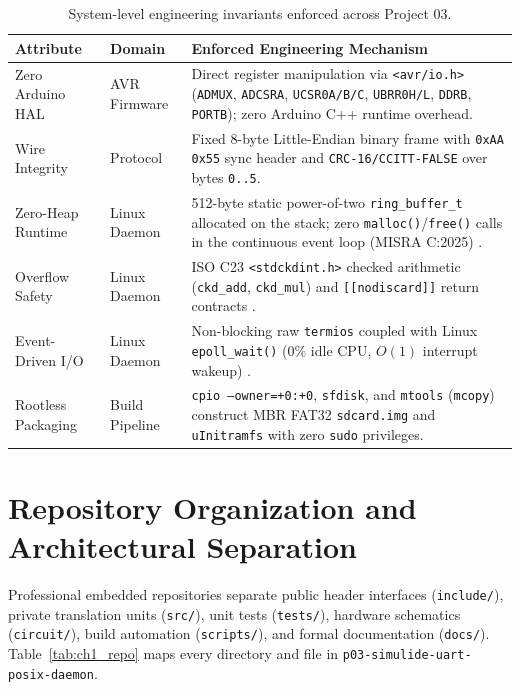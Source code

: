 \documentclass[11pt,a4paper,oneside]{report}
\begin{document}
\begin{table}[!htbp]
\centering
\caption{System-level engineering invariants enforced across Project 03.}
\label{tab:ch1_invariants}
\begin{tabularx}{\linewidth}{l l X}
\toprule
\textbf{Attribute} & \textbf{Domain} & \textbf{Enforced Engineering Mechanism} \\
\midrule
Zero Arduino HAL & AVR Firmware & Direct register manipulation via \texttt{<avr/io.h>} (\texttt{ADMUX}, \texttt{ADCSRA}, \texttt{UCSR0A/B/C}, \texttt{UBRR0H/L}, \texttt{DDRB}, \texttt{PORTB}); zero Arduino C++ runtime overhead. \\
Wire Integrity & Protocol & Fixed 8-byte Little-Endian binary frame with \texttt{0xAA 0x55} sync header and \texttt{CRC-16/CCITT-FALSE} over bytes \texttt{0..5}. \\
Zero-Heap Runtime & Linux Daemon & 512-byte static power-of-two \texttt{ring\_buffer\_t} allocated on the stack; zero \texttt{malloc()}/\texttt{free()} calls in the continuous event loop (MISRA C:2025) \cite{misra2025}. \\
Overflow Safety & Linux Daemon & ISO C23 \texttt{<stdckdint.h>} checked arithmetic (\texttt{ckd\_add}, \texttt{ckd\_mul}) and \texttt{[[nodiscard]]} return contracts \cite{gustedt2025,cppref_numeric}. \\
Event-Driven I/O & Linux Daemon & Non-blocking raw \texttt{termios} coupled with Linux \texttt{epoll\_wait()} ($0\%$ idle CPU, $O(1)$ interrupt wakeup) \cite{man_termios,man_epoll}. \\
Rootless Packaging & Build Pipeline & \texttt{cpio --owner=+0:+0}, \texttt{sfdisk}, and \texttt{mtools} (\texttt{mcopy}) construct MBR FAT32 \texttt{sdcard.img} and \texttt{uInitramfs} with zero \texttt{sudo} privileges. \\
\bottomrule
\end{tabularx}
\end{table}

\section{Repository Organization and Architectural Separation}

Professional embedded repositories separate public header interfaces (\texttt{include/}), private translation units (\texttt{src/}), unit tests (\texttt{tests/}), hardware schematics (\texttt{circuit/}), build automation (\texttt{scripts/}), and formal documentation (\texttt{docs/}). Table~\ref{tab:ch1_repo} maps every directory and file in \texttt{p03-simulide-uart-posix-daemon}.
\end{document}
